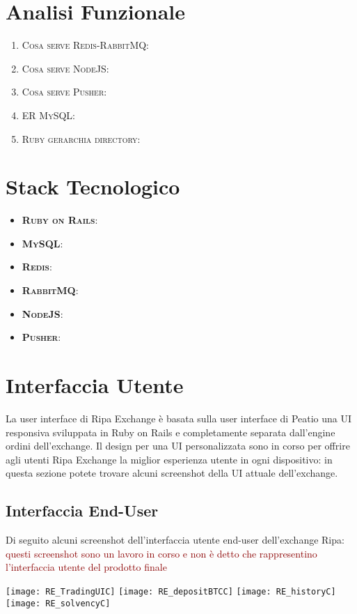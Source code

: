 \documentclass[11pt,fleqn]{book} %
\begin{document}
\section{Analisi Funzionale}
\begin{enumerate}
	\item \textsc{Cosa serve Redis-RabbitMQ}:
	\item \textsc{Cosa serve NodeJS}: 
	\item \textsc{Cosa serve Pusher}:
	\item \textsc{ER MySQL}:
	\item \textsc{Ruby gerarchia directory}:
\end{enumerate}

\section{Stack Tecnologico}
\begin{itemize}
	\item \textbf{\textsc{Ruby on Rails}}:
	\item \textbf{\textsc{MySQL}}: 
	\item \textbf{\textsc{Redis}}:
	\item \textbf{\textsc{RabbitMQ}}:
	\item \textbf{\textsc{NodeJS}}:
	\item \textbf{\textsc{Pusher}}:
\end{itemize}

\section{Interfaccia Utente}
La user interface di Ripa Exchange è basata sulla user interface di Peatio una UI responsiva sviluppata in Ruby on Rails e 
completamente separata dall'engine ordini dell'exchange.
Il design per una UI personalizzata sono in corso per offrire agli utenti Ripa Exchange la miglior esperienza utente in ogni
dispositivo: in questa sezione potete trovare alcuni screenshot della UI attuale dell'exchange.

\subsection{Interfaccia End-User}
Di seguito alcuni screenshot dell'interfaccia utente end-user dell'exchange Ripa:
\textcolor{darkred}{questi screenshot sono un lavoro in corso e non è detto che rappresentino l'interfaccia utente del prodotto finale}
\begin{center}
	\texttt{[image: RE\_TradingUIC]}
	\texttt{[image: RE\_depositBTCC]}
	\texttt{[image: RE\_historyC]}
	\texttt{[image: RE\_solvencyC]}
\end{center}
\end{document}
